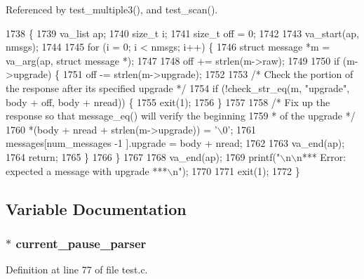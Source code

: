 Referenced by test\+\_\+multiple3(), and test\+\_\+scan().


\begin{DoxyCode}
1738                                                                              \{
1739   va\_list ap;
1740   \textcolor{keywordtype}{size\_t} i;
1741   \textcolor{keywordtype}{size\_t} off = 0;
1742 
1743   va\_start(ap, nmsgs);
1744 
1745   \textcolor{keywordflow}{for} (i = 0; i < nmsgs; i++) \{
1746     \textcolor{keyword}{struct }message *m = va\_arg(ap, \textcolor{keyword}{struct} message *);
1747 
1748     off += strlen(m->raw);
1749 
1750     \textcolor{keywordflow}{if} (m->upgrade) \{
1751       off -= strlen(m->upgrade);
1752 
1753       \textcolor{comment}{/* Check the portion of the response after its specified upgrade */}
1754       \textcolor{keywordflow}{if} (!check_str_eq(m, \textcolor{stringliteral}{"upgrade"}, body + off, body + nread)) \{
1755         exit(1);
1756       \}
1757 
1758       \textcolor{comment}{/* Fix up the response so that message\_eq() will verify the beginning}
1759 \textcolor{comment}{       * of the upgrade */}
1760       *(body + nread + strlen(m->upgrade)) = \textcolor{charliteral}{'\(\backslash\)0'};
1761       messages[num_messages -1 ].upgrade = body + nread;
1762 
1763       va\_end(ap);
1764       \textcolor{keywordflow}{return};
1765     \}
1766   \}
1767 
1768   va\_end(ap);
1769   printf(\textcolor{stringliteral}{"\(\backslash\)n\(\backslash\)n*** Error: expected a message with upgrade ***\(\backslash\)n"});
1770 
1771   exit(1);
1772 \}
\end{DoxyCode}


\subsection{Variable Documentation}
\subsubsection[{current\+\_\+pause\+\_\+parser}]{$\ast$ current\+\_\+pause\+\_\+parser\hspace{0.3cm}{\ttfamily [static]}}\label{test_8c_ac3b7f325f30340fa3ac1b4da21ed675f}


Definition at line 77 of file test.\+c.

